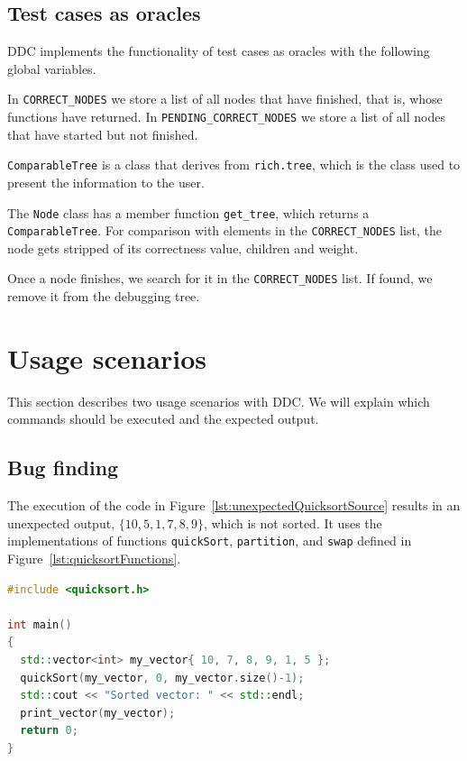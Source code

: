 \subsection{Test cases as oracles}
DDC implements the functionality of test cases as oracles with the following global variables.

In \verb|CORRECT_NODES| we store a list of all nodes that have finished, that is, whose functions have returned.
In \verb|PENDING_CORRECT_NODES| we store a list of all nodes that have started but not finished.

\verb|ComparableTree| is a class that derives from \verb|rich.tree|, which is the class used to present the information to the user.

The \verb|Node| class has a member function \verb|get_tree|, which returns a \verb|ComparableTree|.
For comparison with elements in the \verb|CORRECT_NODES| list, the node gets stripped of its correctness value, children and weight.

Once a node finishes, we search for it in the \verb|CORRECT_NODES| list. If found, we remove it from the debugging tree.

\section{Usage scenarios}
This section describes two usage scenarios with DDC.
We will explain which commands should be executed and the expected output.

\subsection{Bug finding}
The execution of the code in Figure~\ref{lst:unexpectedQuicksortSource} results in an unexpected output, \(\{10, 5, 1, 7, 8, 9\}\), which is not sorted.
It uses the implementations of functions \verb|quickSort|, \verb|partition|, and \verb|swap| defined in Figure~\ref{lst:quicksortFunctions}.
\begin{lstlisting}[language=C++, caption={Code that results in unexpected output}, frame=tb, label={lst:unexpectedQuicksortSource}]
#include <quicksort.h>

int main()
{
  std::vector<int> my_vector{ 10, 7, 8, 9, 1, 5 };
  quickSort(my_vector, 0, my_vector.size()-1);
  std::cout << "Sorted vector: " << std::endl;
  print_vector(my_vector);
  return 0;
}
\end{lstlisting}

